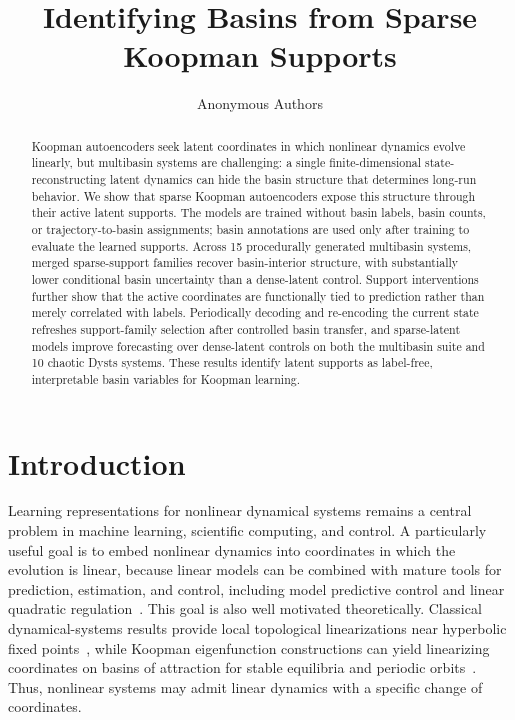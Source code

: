 \documentclass[11pt]{article}
\title{Identifying Basins from Sparse Koopman Supports}
\author{Anonymous Authors}
\date{}
\theoremstyle{plain}
\theoremstyle{definition}
\begin{document}
\maketitle

\begin{abstract}
    Koopman autoencoders seek latent coordinates in which nonlinear dynamics evolve linearly, but multibasin systems are challenging: a single finite-dimensional state-reconstructing latent dynamics can hide the basin structure that determines long-run behavior. We show that sparse Koopman autoencoders expose this structure through their active latent supports. The models are trained without basin labels, basin counts, or trajectory-to-basin assignments; basin annotations are used only after training to evaluate the learned supports. Across 15 procedurally generated multibasin systems, merged sparse-support families recover basin-interior structure, with substantially lower conditional basin uncertainty than a dense-latent control. Support interventions further show that the active coordinates are functionally tied to prediction rather than merely correlated with labels. Periodically decoding and re-encoding the current state refreshes support-family selection after controlled basin transfer, and sparse-latent models improve forecasting over dense-latent controls on both the multibasin suite and 10 chaotic Dysts systems. These results identify latent supports as label-free, interpretable basin variables for Koopman learning.
\end{abstract}

\section{Introduction}
\label{sec:introduction}

Learning representations for nonlinear dynamical systems remains a central problem in
machine learning, scientific computing, and control.
A particularly useful goal is to
embed nonlinear dynamics into coordinates in which the evolution is linear, because linear models can be combined with mature tools for prediction,
estimation, and control, including model predictive control and linear quadratic
regulation~\citep{mayne_constrained_2000,grune_nonlinear_2017,korda_linear_2018, kalman_general_1960, mamakoukas_local_2019}. This goal is also well motivated
theoretically. Classical dynamical-systems results provide local topological
linearizations near hyperbolic fixed points~\citep{grobman1959homeomorphism,
hartman1960lemma}, while Koopman eigenfunction constructions can yield linearizing
coordinates on basins of attraction for stable equilibria and periodic
orbits~\citep{lan_linearization_2013,kvalheim_existence_2021}. Thus, nonlinear systems
may admit linear dynamics with a specific change of coordinates.
\end{document}
